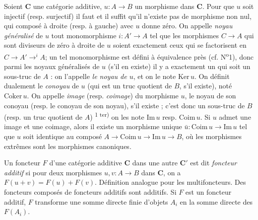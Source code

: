 Soient $\mathbf{C}$ une catégorie additive, $u:A\to B$ un morphisme dans
$\mathbf{C}$. Pour que $u$ soit injectif (resp. surjectif) il faut et il suffit qu'il
n'existe pas de morphisme non nul, qui composé à droite (resp. à gauche) avec
$u$ donne zéro. On appelle \textit{noyau généralisé} de $u$ tout monomorphisme
$i:A'\to A$ tel que les morphismes $C\to A$ qui sont
diviseurs de zéro à droite de $u$ soient exactement ceux qui se factorisent en $C\to A'\mathrel{\mathop{\to}^{i}}A$; un tel monomorphisme est défini à équivalence près (cf.
N\textsuperscript{o}1), donc parmi les noyaux généralisés de $u$ (s'il en
existe) il y a exactement un qui soit un sous-truc de $A$ : on l'appelle
\textit{le noyau de $u$}, et on le note $\mathrm{Ker}\,u$. On définit
dualement le \textit{conoyau} de $u$ (qui est un truc quotient de $B$, s'il
existe), noté $\mathrm{Coker}\,u$. On appelle \textit{image} (resp.
\textit{coimage}) du morphisme $u$, le noyau de son conoyau (resp. le conoyau
de son noyau), s'il existe ; c'est donc un sous-truc de $B$ (resp. un truc
quotient de $A$)%
\textsuperscript{1 ter)}
on les note $\mathrm{Im}\,u$ resp. $\mathrm{Coim}\,u$. Si $u$ admet une image
et une coimage, alors il existe un morphisme unique
$\bar u:\mathrm{Coim}\,u\to\mathrm{Im}\,u$ tel que $u$ soit
identique au composé $A\to\mathrm{Coim}\,u\to\mathrm{Im}\,u\to B$, où les morphismes extrêmes sont les morphismes canoniques.

Un foncteur $F$ d'une catégorie additive $\mathbf{C}$ dans une autre $\mathbf{C}'$ est dit
\textit{foncteur additif} si pour deux morphismes
$u,v:A\to B$ dans $\mathbf{C}$, on a
$F(u+v)=F(u)+F(v)$. Définition analogue pour les multifoncteurs. Des foncteurs
composés de foncteurs additifs sont additifs. Si $F$ est un foncteur additif,
$F$ transforme une somme directe finie d'objets $A_i$ en la somme directe des
$F(A_i)$.


